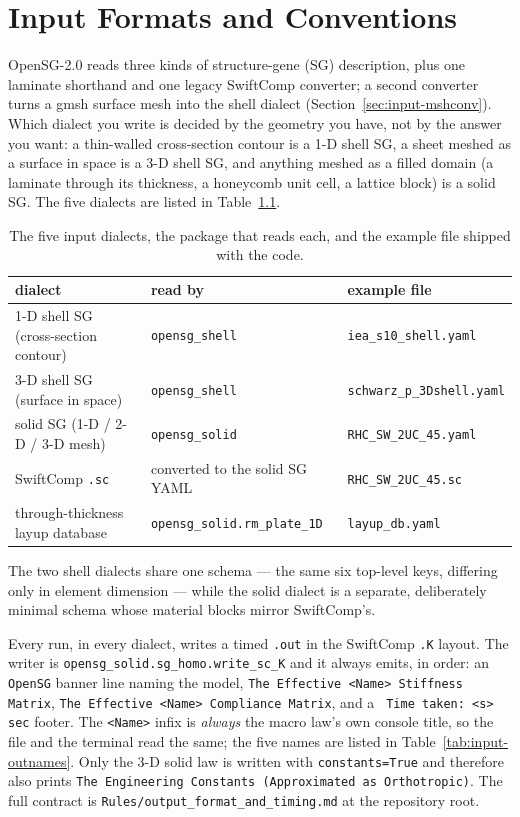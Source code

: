 \chapter{Input Formats and Conventions}
\label{ch:input}

OpenSG-2.0 reads three kinds of structure-gene (SG) description, plus one
laminate shorthand and one legacy SwiftComp converter; a second converter turns
a gmsh surface mesh into the shell dialect
(Section~\ref{sec:input-mshconv}). Which dialect you write is decided
by the geometry you have, not by the answer you want: a thin-walled cross-section
contour is a 1-D shell SG, a sheet meshed as a surface in space is a 3-D shell
SG, and anything meshed as a filled domain (a laminate through its thickness, a
honeycomb unit cell, a lattice block) is a solid SG. The five dialects are listed
in Table~\ref{tab:input-dialects}.

\begin{table}[htbp]
\centering
\small
\caption{The five input dialects, the package that reads each, and the example
file shipped with the code.}
\label{tab:input-dialects}
\begin{tabular}{@{}lll@{}}
\toprule
dialect & read by & example file \\
\midrule
1-D shell SG (cross-section contour) & \texttt{opensg\_shell}
  & \texttt{iea\_s10\_shell.yaml} \\
3-D shell SG (surface in space) & \texttt{opensg\_shell}
  & \texttt{schwarz\_p\_3Dshell.yaml} \\
solid SG (1-D / 2-D / 3-D mesh) & \texttt{opensg\_solid}
  & \texttt{RHC\_SW\_2UC\_45.yaml} \\
SwiftComp \texttt{.sc} & converted to the solid SG YAML
  & \texttt{RHC\_SW\_2UC\_45.sc} \\
through-thickness layup database & \texttt{opensg\_solid.rm\_plate\_1D}
  & \texttt{layup\_db.yaml} \\
\bottomrule
\end{tabular}
\end{table}

The two shell dialects share one schema --- the same six top-level keys,
differing only in element dimension --- while the solid dialect is a separate,
deliberately minimal schema whose material blocks mirror SwiftComp's.

Every run, in every dialect, writes a timed \texttt{.out} in the SwiftComp
\texttt{.K} layout. The writer is \texttt{opensg\_solid.sg\_homo.write\_sc\_K}
and it always emits, in order: an \texttt{ OpenSG} banner line naming the model,
\texttt{The Effective <Name> Stiffness Matrix}, \texttt{The Effective <Name>
Compliance Matrix}, and a \texttt{ Time taken: <s> sec} footer. The
\texttt{<Name>} infix is \emph{always} the macro law's own console title, so
the file and the terminal read the same; the five names are listed in
Table~\ref{tab:input-outnames}. Only the 3-D solid law is written with
\texttt{constants=True} and therefore also prints
\texttt{The Engineering Constants (Approximated as Orthotropic)}. The full
contract is \texttt{Rules/output\_format\_and\_timing.md} at the repository
root.

